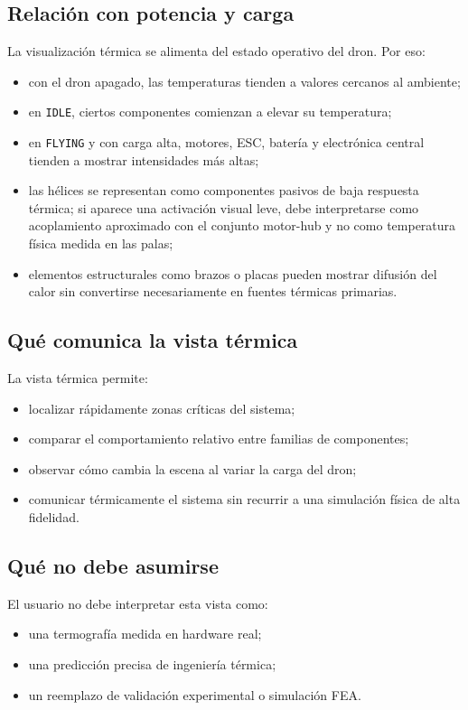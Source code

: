\documentclass[12pt,letterpaper]{article}
\begin{document}
\subsection{Relación con potencia y carga}
La visualización térmica se alimenta del estado operativo del dron. Por eso:
\begin{itemize}
    \item con el dron apagado, las temperaturas tienden a valores cercanos al ambiente;
    \item en \texttt{IDLE}, ciertos componentes comienzan a elevar su temperatura;
    \item en \texttt{FLYING} y con carga alta, motores, ESC, batería y electrónica central tienden a mostrar intensidades más altas;
    \item las hélices se representan como componentes pasivos de baja respuesta térmica; si aparece una activación visual leve, debe interpretarse como acoplamiento aproximado con el conjunto motor-hub y no como temperatura física medida en las palas;
    \item elementos estructurales como brazos o placas pueden mostrar difusión del calor sin convertirse necesariamente en fuentes térmicas primarias.
\end{itemize}

\subsection{Qué comunica la vista térmica}
La vista térmica permite:
\begin{itemize}
    \item localizar rápidamente zonas críticas del sistema;
    \item comparar el comportamiento relativo entre familias de componentes;
    \item observar cómo cambia la escena al variar la carga del dron;
    \item comunicar térmicamente el sistema sin recurrir a una simulación física de alta fidelidad.
\end{itemize}

\subsection{Qué no debe asumirse}
El usuario no debe interpretar esta vista como:
\begin{itemize}
    \item una termografía medida en hardware real;
    \item una predicción precisa de ingeniería térmica;
    \item un reemplazo de validación experimental o simulación FEA.
\end{itemize}
\end{document}
